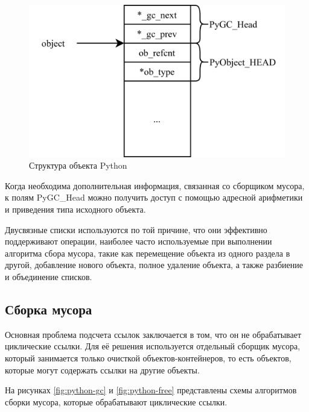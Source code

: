 \begin{figure}[H]
	\centering
	\includegraphics[scale=0.27]{assets/python-object.png}
	\caption{Структура объекта Python}
	\label{fig:pyobject}
\end{figure}

Когда необходима дополнительная информация, связанная со сборщиком мусора, к полям PyGC\_Head можно получить доступ с помощью адресной арифметики и приведения типа исходного объекта. \cite{python_gc}

Двусвязные списки используются по той причине, что они эффективно поддерживают операции, наиболее часто используемые при выполнении алгоритма сбора мусора, такие как перемещение объекта из одного раздела в другой, добавление нового объекта, полное удаление объекта, а также разбиение и объединение списков. \cite{python_gc}



\subsection{Сборка мусора}

Основная проблема подсчета ссылок заключается в том, что он не обрабатывает циклические ссылки. Для её решения используется отдельный сборщик мусора, который занимается только очисткой объектов-контейнеров, то есть объектов, которые могут содержать ссылки на другие объекты. \cite{python_gc}

На рисунках \ref{fig:python-gc} и \ref{fig:python-free} представлены схемы алгоритмов сборки мусора, которые обрабатывают циклические ссылки. \cite{python_gc}

